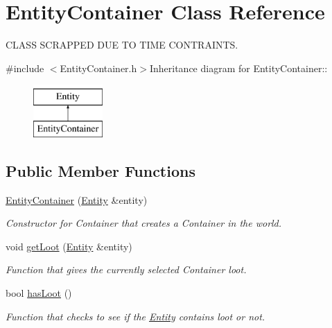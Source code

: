 \hypertarget{classEntityContainer}{
\section{EntityContainer Class Reference}
\label{classEntityContainer}
}


CLASS SCRAPPED DUE TO TIME CONTRAINTS.  


{\ttfamily \#include $<$EntityContainer.h$>$}Inheritance diagram for EntityContainer::\begin{figure}[H]
\begin{center}
\leavevmode
\includegraphics[height=2cm]{classEntityContainer}
\end{center}
\end{figure}
\subsection*{Public Member Functions}
\begin{DoxyCompactItemize}
\item 
\hyperlink{classEntityContainer_a5ab518a81cab8bdd644461f7c2b8ce63}{EntityContainer} (\hyperlink{classEntity}{Entity} \&entity)
\begin{DoxyCompactList}\small\item\em Constructor for Container that creates a Container in the world. \item\end{DoxyCompactList}\item 
void \hyperlink{classEntityContainer_aaff8158120180012c66c61bc9c89cc99}{getLoot} (\hyperlink{classEntity}{Entity} \&entity)
\begin{DoxyCompactList}\small\item\em Function that gives the currently selected Container loot. \item\end{DoxyCompactList}\item 
bool \hyperlink{classEntityContainer_aa6dc3c46009f7647eb68a8d8d005f94a}{hasLoot} ()
\begin{DoxyCompactList}\small\item\em Function that checks to see if the \hyperlink{classEntity}{Entity} contains loot or not. \item\end{DoxyCompactList}\end{DoxyCompactItemize}


